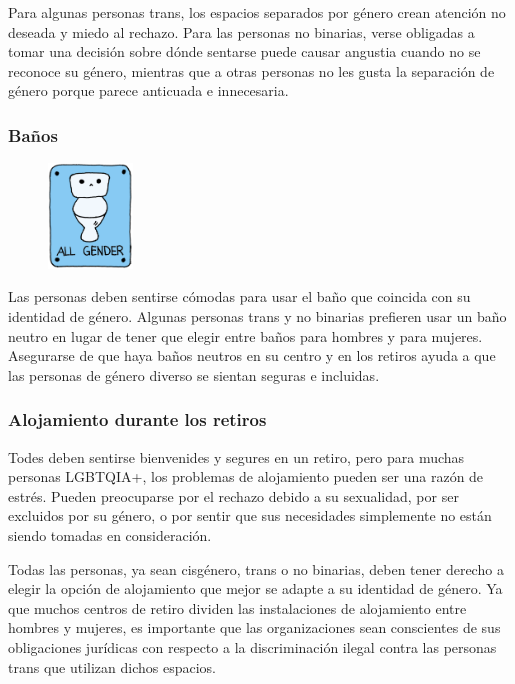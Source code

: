 \documentclass[12pt,openany]{book}
\begin{document}
Para algunas personas trans, los espacios separados por género crean atención no deseada y miedo al rechazo. Para las personas no binarias, verse obligadas a tomar una decisión sobre dónde sentarse puede causar angustia cuando no se reconoce su género, mientras que a otras personas no les gusta la separación de género porque parece anticuada e innecesaria.

\subsubsection*{Baños}

\begin{figure}
    \centering
    \includegraphics[width=0.2\textwidth]{16.png}
\end{figure}
Las personas deben sentirse cómodas para usar el baño que coincida con su identidad de género. Algunas personas trans y no binarias prefieren usar un baño neutro en lugar de tener que elegir entre baños para hombres y para mujeres. Asegurarse de que haya baños neutros en su centro y en los retiros ayuda a que las personas de género diverso se sientan seguras e incluidas.

\subsubsection*{Alojamiento durante los retiros}

Todes deben sentirse bienvenides y segures en un retiro, pero para muchas personas LGBTQIA+, los problemas de alojamiento pueden ser una razón de estrés. Pueden preocuparse por el rechazo debido a su sexualidad, por ser excluidos por su género, o por sentir que sus necesidades simplemente no están siendo tomadas en consideración.

Todas las personas, ya sean cisgénero, trans o no binarias, deben tener derecho a elegir la opción de alojamiento que mejor se adapte a su identidad de género.
Ya que muchos centros de retiro dividen las instalaciones de alojamiento entre hombres y mujeres, es importante que las organizaciones sean conscientes de sus obligaciones jurídicas con respecto a la discriminación ilegal contra las personas trans que utilizan dichos espacios.
\end{document}
